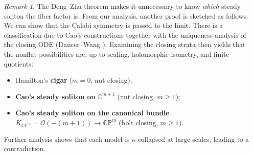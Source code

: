 \documentclass[11pt]{amsart}
\theoremstyle{plain}
\numberwithin{equation}{section}
\theoremstyle{definition}
\theoremstyle{remark}
\newtheorem*{remarkx}{Remark}
\begin{document}
\begin{remarkx} The Deng--Zhu theorem makes it unnecessary to know \emph{which} steady soliton the fiber factor is. From our analysis, another proof is sketched as follows. We can show that the Calabi symmetry is passed to the limit. There is a classification due to Cao's constructions \cite{Cao96} together with the uniqueness analysis of the closing ODE (Dancer--Wang \cite{DW2011}). Examining the closing strata then yields that the nonflat possibilities are, up to scaling, holomorphic isometry, and finite quotients:

\begin{itemize}
	\item Hamilton's \textbf{cigar} ($m = 0$, nut closing);
	\item \textbf{Cao's steady soliton on} $\mathbb{C}^{m + 1}$ (nut closing, $m \geq 1$);
	\item \textbf{Cao's steady soliton on the canonical bundle} $K_{\mathbb{CP}^m} = \mathcal{O} ( - ( m + 1 ) ) \to \mathbb{CP}^m$ (bolt closing, $m \geq 1$).
\end{itemize}	
Further analysis shows that each model is $\kappa$-collapsed at large scales, leading to a contradiction. 
\end{remarkx}	 
\iffalse
\end{document}
